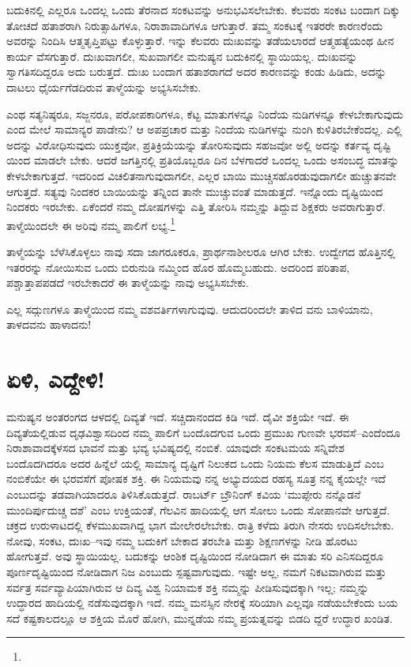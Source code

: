 ಬದುಕಿನಲ್ಲಿ ಎಲ್ಲರೂ ಒಂದಲ್ಲ ಒಂದು ತೆರನಾದ ಸಂಕಟವನ್ನು ಅನುಭವಿಸಲೇಬೇಕು. ಕೆಲವರು ಸಂಕಟ ಬಂದಾಗ ದಿಕ್ಕು ತೋಚದೆ ಹತಾಶರಾಗಿ ನಿರುತ್ಸಾಹಿಗಳೂ, ನಿರಾಶಾವಾದಿಗಳೂ ಆಗುತ್ತಾರೆ. ತಮ್ಮ ಸಂಕಟಕ್ಕೆ ಇತರರೇ ಕಾರಣರೆಂದು ಅವರನ್ನು ನಿಂದಿಸಿ ಆತ್ಮತೃಪ್ತಿಪಟ್ಟು ಕೊಳ್ಳುತ್ತಾರೆ. ಇನ್ನು ಕೆಲವರು ದುಃಖವನ್ನು ತಡೆಯಲಾರದೆ ಆತ್ಮಹತ್ಯೆಯಂಥ ಹೀನ ಕಾರ್ಯ ವೆಸಗುತ್ತಾರೆ. ದುಃಖವಾಗಲೀ, ಸುಖವಾಗಲೀ ಮನುಷ್ಯನ ಬದುಕಿನಲ್ಲಿ ಸ್ಥಾಯಿಯಲ್ಲ. ದುಃಖವನ್ನು ಸ್ವಾಗತಿಸದಿದ್ದರೂ ಅದು ಬರುತ್ತದೆ. ದುಃಖ ಬಂದಾಗ ಹತಾಶರಾಗದೆ ಅದರ ಕಾರಣವನ್ನು ಕಂಡು ಹಿಡಿದು, ಅದನ್ನು ದಾಟಲು ಧೈರ್ಯಗೆಡದಿರುವ ತಾಳ್ಮೆಯನ್ನು ಅಭ್ಯಸಿಸಬೇಕು.

ಎಂಥ ಸತ್ಯನಿಷ್ಠರೂ, ಸಜ್ಜನರೂ, ಪರೋಪಕಾರಿಗಳೂ, ಕೆಟ್ಟ ಮಾತುಗಳನ್ನೂ ನಿಂದೆಯ ನುಡಿಗಳನ್ನೂ ಕೇಳಬೇಕಾಗುವುದು ಎಂದ ಮೇಲೆ ಸಾಮಾನ್ಯರ ಪಾಡೇನು? ಆ ಅಪಪ್ರಚಾರ ಮತ್ತು ನಿಂದೆಯ ನುಡಿಗಳನ್ನು ನುಂಗಿ ಕುಳಿತಿರಬೇಕೆಂದಲ್ಲ. ಎಲ್ಲಿ ಅದನ್ನು ವಿರೋಧಿಸುವುದು ಯುಕ್ತವೋ, ಪ್ರತಿಕ್ರಿಯೆಯನ್ನು ತೋರಿಸುವುದು ಸಹಜವೋ ಅಲ್ಲಿ ಅದನ್ನು ಕರ್ತವ್ಯ ದೃಷ್ಟಿ ಯಿಂದ ಮಾಡಲೇ ಬೇಕು. ಆದರೆ ಜಗತ್ತಿನಲ್ಲಿ ಪ್ರತಿಯೊಬ್ಬರೂ ದಿನ ಬೆಳಗಾದರೆ ಒಂದಲ್ಲ ಒಂದು ಅಸಂಬದ್ಧ ಮಾತನ್ನು ಕೇಳಬೇಕಾಗುತ್ತದೆ. ಇದರಿಂದ ವಿಚಲಿತನಾಗುವುದಾಗಲೀ, ಎಲ್ಲರ ಬಾಯಿ ಮುಚ್ಚಿಸಹೊರಡುವುದಾಗಲೀ ಹುಚ್ಚುತನವೇ ಆಗುತ್ತದೆ. ಸತ್ಯವು ನಿಂದಕರ ಬಾಯಿಯನ್ನು ತನ್ನಿಂದ ತಾನೇ ಮುಚ್ಚುವಂತೆ ಮಾಡುತ್ತದೆ. ಇನ್ನೊಂದು ದೃಷ್ಟಿಯಿಂದ ನಿಂದಕರು ಇರಬೇಕು. ಏಕೆಂದರೆ ನಮ್ಮ ದೋಷಗಳನ್ನು ಎತ್ತಿ ತೋರಿಸಿ ನಮ್ಮನ್ನು ತಿದ್ದುವ ಶಿಕ್ಷಕರು ಅವರಾಗುತ್ತಾರೆ. ತಾಳ್ಮೆಯಿಂದಲೇ ಈ ಅರಿವು ನಮ್ಮ ಪಾಲಿಗೆ ಲಭ್ಯ.\footnote{}

ತಾಳ್ಮೆಯನ್ನು ಬೆಳೆಸಿಕೊಳ್ಳಲು ನಾವು ಸದಾ ಜಾಗರೂಕರೂ, ಪ್ರಾರ್ಥನಾಶೀಲರೂ ಆಗಿರ ಬೇಕು. ಉದ್ವೇಗದ ಹೊತ್ತಿನಲ್ಲಿ ಇತರರನ್ನು ನೋಯಿಸುವ ಒಂದು ಬಿರುನುಡಿ ನಮ್ಮಿಂದ ಹೊರ ಹೊಮ್ಮಬಹುದು. ಅದರಿಂದ ಪರಿತಾಪ, ಪಶ್ಚಾತ್ತಾಪಪಡದೆ ಇರಬೇಕಾದರೆ ಈ ತಾಳ್ಮೆಯನ್ನು ನಾವು ಅಭ್ಯಸಿಸಬೇಕು.

ಎಲ್ಲ ಸದ್ಗುಣಗಳೂ ತಾಳ್ಮೆಯಿಂದ ನಮ್ಮ ವಶವರ್ತಿಗಳಾಗುವುವು. ಆದುದರಿಂದಲೇ ತಾಳಿದ ವನು ಬಾಳಿಯಾನು, ತಾಳದವನು ಹಾಳಾದನು!


\section*{ಏಳಿ, ಎದ್ದೇಳಿ!}


ಮನುಷ್ಯನ ಅಂತರಂಗದ ಆಳದಲ್ಲಿ ದಿವ್ಯತೆ ಇದೆ. ಸಚ್ಚಿದಾನಂದದ ಕಿಡಿ ಇದೆ. ದೈವೀ ಶಕ್ತಿಯೇ ಇದೆ. ಈ ದಿವ್ಯತೆಯಲ್ಲಿಡುವ ದೃಢವಿಶ್ವಾಸದಿಂದ ನಮ್ಮ ಪಾಲಿಗೆ ಬಂದೊದಗುವ ಒಂದು ಪ್ರಮುಖ ಗುಣವೇ ಭರವಸೆ–ಎಂದೆಂದೂ ನಿರಾಶಾವಾದಕ್ಕೆಳಸದ ಭಾವನೆ ಮತ್ತು ಭವ್ಯ ಭವಿಷ್ಯದಲ್ಲಿ ನಂಬಿಕೆ. ಯಾವುದೇ ಸಂಕಟಮಯ ಸನ್ನಿವೇಶ ಬಂದೊದಗಿದರೂ ಅದರ ಹಿನ್ನೆಲೆ ಯಲ್ಲಿ ಸಾಮಾನ್ಯ ದೃಷ್ಟಿಗೆ ನಿಲುಕದ ಒಂದು ನಿಯಮ ಕೆಲಸ ಮಾಡುತ್ತಿದೆ ಎಂಬ ನಂಬಿಕೆಯೇ ಈ ಭರವಸೆಗೆ ಪೋಷಕ ಶಕ್ತಿ. ಈ ನಿಯಮವು ನನ್ನ ಅಭ್ಯುದಯದ ರಹಸ್ಯ ಸೂತ್ರ ನನ್ನ ಕೈಯಲ್ಲೇ ಇದೆ ಎಂಬುದನ್ನು ತಡವಾಗಿಯಾದರೂ ತಿಳಿಸಿಕೊಡುತ್ತದೆ. ರಾಬರ್ಟ್ ಬ್ರೌನಿಂಗ್ ಕವಿಯ ‘ಮುಪ್ಪೇರು ನನ್ನೊಡನೆ ಮುಂದಿರ್ಪುದುಚ್ಚ ದಶೆ’ ಎಂಬ ಉಕ್ತಿಯಂತೆ, ಗೆಲವಿನ ಹಾದಿಯಲ್ಲಿ ಆಗ ಸೋಲು ಒಂದು ಸೋಪಾನವೇ ಆಗುತ್ತದೆ. ಚಕ್ರದ ಉರುಳಾಟದಲ್ಲಿ ಕೆಳಮುಖವಾಗಿದ್ದ ಭಾಗ ಮೇಲೇರಲೇಬೇಕು. ರಾತ್ರಿ ಕಳೆದು ತಿರುಗಿ ನೇಸರು ಉದಿಸಲೇಬೇಕು. ನೋವು, ಸಂಕಟ, ದುಃಖ–ಇವು ನಮ್ಮ ಬದುಕಿಗೆ ಬೇಕಾದ ತರಬೇತಿ ಮತ್ತು ಶಿಕ್ಷಣಗಳನ್ನು ನೀಡಿ ಹೊರಟು ಹೋಗುತ್ತವೆ. ಅವು ಸ್ಥಾಯಿಯಲ್ಲ. ಬದುಕನ್ನು ಆಂಶಿಕ ದೃಷ್ಟಿಯಿಂದ ನೋಡಿದಾಗ ಈ ಮಾತು ಸರಿ ಎನಿಸದಿದ್ದರೂ ಪೂರ್ಣದೃಷ್ಟಿಯಿಂದ ನೋಡಿದಾಗ ನಿಜ ಎಂಬುದು ಸ್ಪಷ್ಟವಾಗುವುದು. ಇಷ್ಟೇ ಅಲ್ಲ, ನಮಗೆ ನಿಕಟವಾಗಿರುವ ಮತ್ತು ಸರ್ವತ್ರ ಸರ್ವವ್ಯಾಪಿಯಾಗಿರುವ ಆ ದಿವ್ಯ ವಿಶ್ವ ನಿಯಾಮಕ ಶಕ್ತಿ ನಮ್ಮನ್ನು ಪೀಡಿಸುವುದಕ್ಕಾಗಿ ಇಲ್ಲ; ನಮ್ಮನ್ನು ಉದ್ಧಾರದ ಹಾದಿಯಲ್ಲಿ ನಡೆಸುವುದಕ್ಕಾಗಿ ಇದೆ. ನಮ್ಮ ಮನಸ್ಸಿನ ನೇರಕ್ಕೆ ಸರಿಯಾಗಿ ಎಲ್ಲವೂ ನಡೆಯಬೇಕೆಂದು ಬಯ ಸದೆ ಕಷ್ಟಕಾಲದಲ್ಲೂ ಆ ಶಕ್ತಿಯ ಮೊರೆ ಹೋಗಿ, ಮುನ್ನಡೆಯ ನಮ್ಮ ಪ್ರಯತ್ನವನ್ನು ಬಿಡದಿ ದ್ದರೆ ಉದ್ಧಾರ ಖಂಡಿತ.

